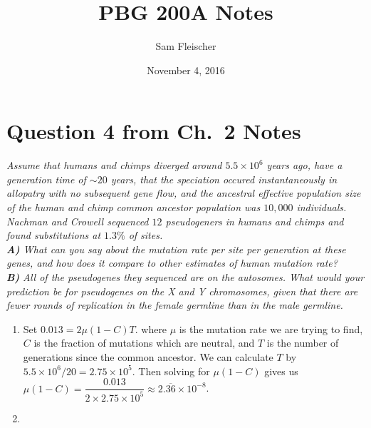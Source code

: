 \documentclass{article}
\title{PBG 200A Notes}
\author{Sam Fleischer}
\date{November 4, 2016}
\begin{document}
    \maketitle

    \section{Question 4 from Ch.~2 Notes}
        \emph{Assume that humans and chimps diverged around $5.5\times10^6$ years ago, have a generation time of $\sim20$ years, that the speciation occured instantaneously in allopatry with no subsequent gene flow, and the ancestral effective population size of the human and chimp common ancestor population was $10,000$ individuals.  Nachman and Crowell sequenced $12$ pseudogeners in humans and chimps and found substitutions at $1.3\%$ of sites. \\
        \textbf{A)} What can you say about the mutation rate per site per generation at these genes, and how does it compare to other estimates of human mutation rate? \\
        \textbf{B)} All of the pseudogenes they sequenced are on the autosomes.  What would your prediction be for pseudogenes on the X and Y chromosomes, given that there are fewer rounds of replication in the female germline than in the male germline.}
        \begin{enumerate}[\bf\ \ A)\ ]
            \item Set $0.013 = 2\mu(1 - C)T$.  where $\mu$ is the mutation rate we are trying to find, $C$ is the fraction of mutations which are neutral, and $T$ is the number of generations since the common ancestor.  We can calculate $T$ by $5.5\times10^6/20 = 2.75\times10^5$.  Then solving for $\mu(1-C)$ gives us $\mu(1-C) = \dfrac{0.013}{2\times2.75\times10^5} \approx 2.\overline{36}\times 10^{-8}$.
            \item 
        \end{enumerate}
\end{document}
